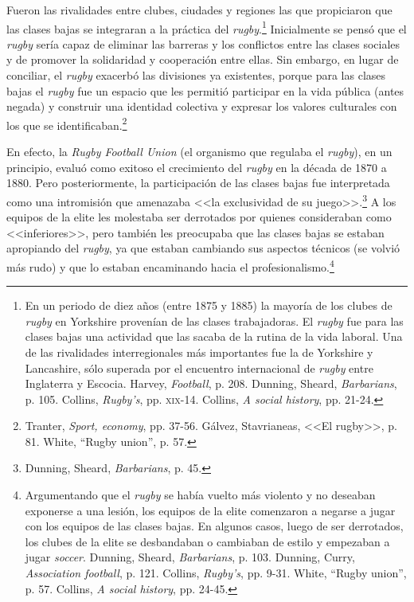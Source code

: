\documentclass[11pt,a5paper,twoside]{book} %
\begin{document}
Fueron las rivalidades entre clubes, ciudades y regiones las que propiciaron que las clases bajas se integraran a la práctica del \emph{rugby}.\footnote{En un periodo de diez años (entre 1875 y 1885) la mayoría de los clubes de \emph{rugby} en Yorkshire provenían de las clases trabajadoras. El \emph{rugby} fue para las clases bajas una actividad que las sacaba de la rutina de la vida laboral. Una de las rivalidades interregionales más importantes fue la de Yorkshire y Lancashire, sólo superada por el encuentro internacional de \emph{rugby} entre Inglaterra y Escocia. Harvey, \emph{Football}, p. 208. Dunning, Sheard, \emph{Barbarians}, p. 105. Collins, \emph{Rugby's}, pp. \textsc{xix}-14. Collins, \emph{A social history}, pp. 21-24.} Inicialmente se pensó que el \emph{rugby} sería capaz de eliminar las barreras y los conflictos entre las clases sociales y de promover la solidaridad y cooperación entre ellas. Sin embargo, en lugar de conciliar, el \emph{rugby} exacerbó las divisiones ya existentes, porque para las clases bajas el \emph{rugby} fue un espacio que les permitió participar en la vida pública (antes negada) y construir una identidad colectiva y expresar los valores culturales con los que se identificaban.\footnote{Tranter, \emph{Sport, economy}, pp. 37-56. Gálvez, Stavrianeas, <<El rugby>>, p. 81. White, ``Rugby union'', p. 57.}

En efecto, la \emph{Rugby Football Union} (el organismo que regulaba el \emph{rugby}), en un principio, evaluó como exitoso el crecimiento del \emph{rugby} en la década de 1870 a 1880. Pero posteriormente, la participación de las clases bajas fue interpretada como una intromisión que amenazaba <<la exclusividad de su juego>>.\footnote{Dunning, Sheard, \emph{Barbarians}, p. 45.} A los equipos de la elite les molestaba ser derrotados por quienes consideraban como <<inferiores>>, pero también les preocupaba que las clases bajas se estaban apropiando del \emph{rugby}, ya que estaban cambiando sus aspectos técnicos (se volvió más rudo) y que lo estaban encaminando hacia el profesionalismo.\footnote{Argumentando que el \emph{rugby} se había vuelto más violento y no deseaban exponerse a una lesión, los equipos de la elite comenzaron a negarse a jugar con los equipos de las clases bajas. En algunos casos, luego de ser derrotados, los clubes de la elite se desbandaban o cambiaban de estilo y empezaban a jugar \emph{soccer}. Dunning, Sheard, \emph{Barbarians}, p. 103. Dunning, Curry, \emph{Association football}, p. 121. Collins, \emph{Rugby's}, pp. 9-31. White, ``Rugby union'', p. 57. Collins, \emph{A social history}, pp. 24-45.}
\end{document}
